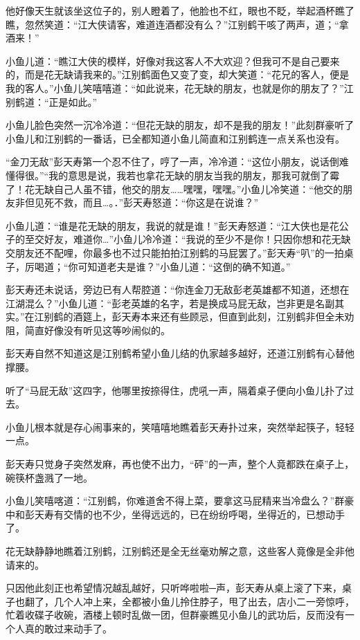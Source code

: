 \documentclass[12pt,oneside]{book}
\begin{document}
他好像天生就该坐这位子的，别人瞪着了，他脸也不红，眼也不眨，举起酒杯瞧了瞧，忽然笑道：``江大侠请客，难道连酒都没有么？''江别鹤干咳了两声，道；``拿酒来！''

小鱼儿道：``瞧江大侠的模样，好像对我这客人不大欢迎？但我可不是自己要来的，而是花无缺请我来的。''江别鹤面色又变了变，却大笑道：``花兄的客人，便是我的客人。''小鱼儿笑嘻嘻道：``如此说来，花无缺的朋友，也就是你的朋友了？''江别鹤道：``正是如此。''

小鱼儿脸色突然一沉冷冷道：``但花无缺的朋友，却不是我的朋友！''此刻群豪听了小鱼儿和江别鹤的一番话，已全都知道小鱼儿简直和江别鹤连一点关系也没有。

``金刀无敌''彭天寿第一个忍不住了，哼了一声，冷冷道：``这位小朋友，说话倒难懂得很。''``我的意思是说，我若也拿花无缺的朋友当我的朋友，那我可就倒了霉了！花无缺自己人虽不错，他交的朋友\ldots\ldots 嘿嘿，嘿嘿。''小鱼儿冷笑道：``他交的朋友非但见死不救，而且\ldots。．''彭天寿怒道：``你这是在说谁？''

小鱼儿道：``谁是花无缺的朋友，我说的就是谁！''彭天寿怒道：``江大侠也是花公子的至交好友，难道你\ldots{}''小鱼儿冷冷道：``我说的至少不是你！只因你想和花无缺交朋友还不配哩，你最多也不过只能拍拍江别鹤的马屁罢了。''彭天寿``叭''的一拍桌子，厉喝道；``你可知道老夫是谁？''小鱼儿道：``这倒的确不知道。''

彭天寿还未说话，旁边已有人帮腔道：``你连金刀无敌彭老英雄都不知道，还想在江湖混么？''小鱼儿道：``彭老英雄的名字，若是换成马屁无敌，岂非更是名副其实。''在江别鹤的酒筵上，彭天寿本来还有些顾忌，但直到此刻，江别鹤非但全未劝阻，简直好像没有听见这等吵闹似的。

彭天寿自然不知道这是江别鹤希望小鱼儿结的仇家越多越好，还道江别鹤有心替他撑腰。

听了``马屁无敌''这四字，他哪里按捺得住，虎吼一声，隔着桌子便向小鱼儿扑了过去。

小鱼儿根本就是存心闹事来的，笑嘻嘻地瞧着彭天寿扑过来，突然举起筷子，轻轻一点。

彭天寿只觉身子突然发麻，再也使不出力，``砰''的一声，整个人竟都跌在桌子上，碗筷杯盏溅了一地。

小鱼儿笑嘻喀道：``江别鹤，你难道舍不得上菜，要拿这马屁精来当冷盘么？''群豪中和彭天寿有交情的也不少，坐得远远的，已在纷纷呼喝，坐得近的，已想动手了。

花无缺静静地瞧着江别鹤，江别鹤还是全无丝毫劝解之意，这些客人竟像是全非他请来的。

只因他此刻正也希望情况越乱越好，只听哗啦啦─声，彭天寿从桌上滚了下来，桌子也翻了，几个人冲上来，全都被小鱼儿拎住脖子，甩了出去，店小二一旁惊呼，忙着收碟子收碗，酒楼上顿时乱做一团，但群豪瞧见小鱼儿的武功后，反而没有一个人真的敢过来动手了。
\end{document}

